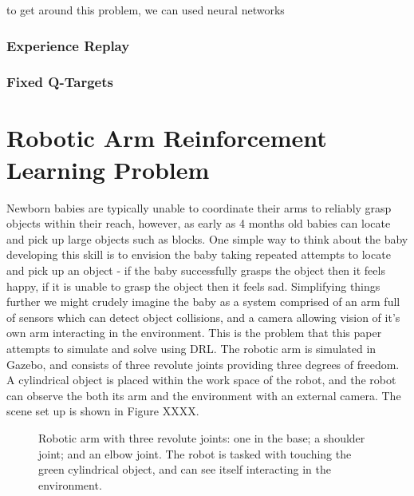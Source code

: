 \documentclass[a4paper]{article}
\begin{document}
to get around this problem, we can used neural networks
\subsubsection{Experience Replay}
\subsubsection{Fixed Q-Targets}

\newpage

\section{Robotic Arm Reinforcement Learning Problem}
Newborn babies are typically unable to coordinate their arms to reliably grasp objects within their reach, however, as early as 4 months old babies can locate and pick up large objects such as blocks. One simple way to think about the baby developing this skill is to envision the baby taking repeated attempts to locate and pick up an object - if the baby successfully grasps the object then it feels happy, if it is unable to grasp the object then it feels sad. Simplifying things further we might crudely imagine the baby as a system comprised of an arm full of sensors which can detect object collisions, and a camera allowing vision of it's own arm interacting in the environment. This is the problem that this paper attempts to simulate and solve using DRL. The robotic arm is simulated in Gazebo, and consists of three revolute joints providing three degrees of freedom. A cylindrical object is placed within the work space of the robot, and the robot can observe the both its arm and the environment with an external camera. The scene set up is shown in Figure XXXX.
\begin{figure}[h]
\centering
{}
\caption{Robotic arm with three revolute joints: one in the base; a shoulder joint; and an elbow joint. The robot is tasked with touching the green cylindrical object, and can see itself interacting in the environment.}
\end{figure}
\end{document}
